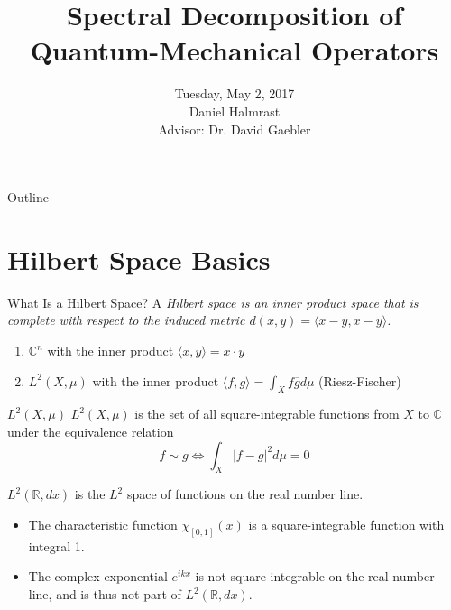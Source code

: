 \documentclass{beamer}
\title %
{Spectral Decomposition of Quantum-Mechanical Operators}
\institute[Hillsdale College] %
\date %
{Tuesday, May 2, 2017\\Daniel Halmrast\\Advisor: Dr. David Gaebler}
\begin{document}
\begin{frame}
  \titlepage

\end{frame}

\begin{frame}{Outline}
  \tableofcontents
\end{frame}




\section{Hilbert Space Basics}
\begin{frame}{What Is a Hilbert Space?}
    A \em Hilbert space \em is an inner product space that is complete with
    respect to the induced metric $d(x,y) = \langle x-y, x-y \rangle$.
    \begin{example}
        \begin{enumerate}
        \item $\mathbb{C}^n$ with the inner product 
            $\langle x,y \rangle = x \cdot y$
        \item $L^2(X,\mu)$ with the inner product
            $\langle f,g \rangle = \int_X f\overline{g}d\mu$ (Riesz-Fischer)
        \end{enumerate}
    \end{example}
\end{frame}

\begin{frame}{$L^2(X,\mu)$}
    $L^2(X,\mu)$ is the set of all square-integrable functions from $X$ to
    $\mathbb{C}$ under the equivalence relation
    \[
        f\sim g \iff \int_X |f-g|^2d\mu =0
    \]
    \pause
    \begin{example}
        $L^2(\mathbb{R},dx)$ is the $L^2$ space of functions on the
        real number line.

        \begin{itemize}
            \item The characteristic function $\chi_{[0,1]}(x)$ is a
                square-integrable function with integral 1.
            \item The complex exponential $e^{ikx}$ is not square-integrable on
                the real number line, and is thus not part of
                $L^2(\mathbb{R},dx)$.
        \end{itemize}
    \end{example}
\end{frame}
\end{document}
